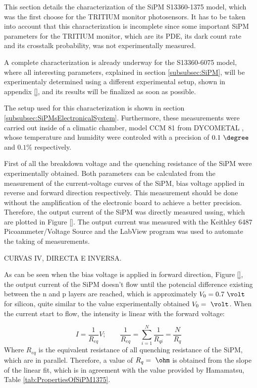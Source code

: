 This section details the characterization of the SiPM S13360-1375 model, which was the first choose for the TRITIUM monitor photosensors. It has to be taken into account that this characterization is incomplete since some important SiPM parameters for the TRITIUM monitor, which are its PDE, its dark count rate and its crosstalk probability, was not experimentally measured. 

A complete characterization is already underway for the S13360-6075 model, where all interesting parameters, explained in section \ref{subsubsec:SiPM}, will be experimentaly determined using a different experimental setup, shown in appendix \ref{}, and its results will be finalized as soon as possible.

The setup used for this characterization is shown in section \ref{subsubsec:SiPMsElectronicalSystem}. Furthermore, these measurements were carried out inside of a climatic chamber, model CCM 81 from DYCOMETAL \cite{ClimaticChamberIFIMED}, whose temperature and humidity were controled with a precision of $0.1~\degree$ and $0.1\%$ respectively. 

First of all the breakdown voltage and the quenching resistance of the SiPM were experimentally obtained. Both parameters can be calculated from the measurement of the current-voltage curves of the SiPM, bias voltage applied in reverse and forward direction respectively. This measurement should be done without the amplification of the electronic board to achieve a better precision. Therefore, the output current of the SiPM was directly measured ussing, which are plotted in Figure \ref{}. The output current was measured with the Keithley 6487 Picoammeter/Voltage Source \cite{DataSheetKeithley6487} and the LabView program was used to automate the taking of measurements.

CURVAS IV, DIRECTA E INVERSA.

As can be seen when the bias voltage is applied in forward direction, Figure \ref{}, the output current of the SiPM doesn't flow until the potencial difference existing between the n and p layers are reached, which is approximately $V_0=0.7~\volt$ for silicon, quite similar to the value experimentally obtained $V_0= ~\volt$. When the current start to flow, the intensity is linear with the forward voltage:

\begin{equation}
I=\frac{1}{R_{eq}}V;  \qquad \frac{1}{R_{eq}} = \sum_{i=1}^{N}\frac{1}{R_{qi}}= \frac{N}{R_{q}}
\label{QuenchingResistance}
\end{equation}
Where $R_{eq}$ is the equivalent resistance of all quenching resistance of the SiPM, which are in parallel. Therefore, a value of $R_{q}= ~\ohm$ is obtained from the slope of the linear fit, which is in agreement with the value provided by Hamamatsu, Table \ref{tab:PropertiesOfSiPM1375}.

